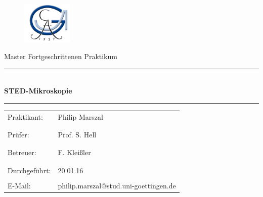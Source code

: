 \documentclass[a4paper, 12pt, ngerman]{article}
\begin{document}
 \begin{titlepage}
 \begin{figure}[t]
 \includegraphics[height=2cm]{georg} \hfill
 \end{figure}

\normalsize
\vspace{1cm}

\begin{center}
\Large Master Fortgeschrittenen Praktikum \\ \vspace{1cm}
\hrule \vspace{3mm}
\large {} \\
\Huge{\bf STED-Mikroskopie}
\vspace{5mm}
\hrule
\end{center}

\normalsize


\begin{table}[!h]
\begin{center}

  \begin{tabular}{ll}
  Praktikant: &Philip Marszal\\
   &\\
   &\\
  Prüfer: & Prof. S. Hell\\
	&\\
	&\\
  Betreuer: & F. Kleißler\\
  &\\
  &\\
	  Durchgeführt: & 20.01.16\\

\vspace{1cm}& \\
  E-Mail: & \ttfamily philip.marszal@stud.uni-goettingen.de\\
\end{tabular}
\end{center}
\end{table}
\end{titlepage}
\newpage
\thispagestyle{empty}
\mbox{}
\thispagestyle{empty}
\newpage
\thispagestyle{empty}
\tableofcontents
\newpage

\pagestyle{fancy}
\setcounter{page}{1}
\end{document}
